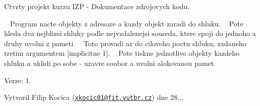Ctvrty projekt kurzu I\+ZP -\/ Dokumentace zdrojovych kodu.

~\newline
Program nacte objekty z adresare a kazdy objekt zaradi do shluku. ~\newline
Pote hleda dva nejblizsi shluky podle nejvzdalenejsi souseda, ktere spoji do jednoho a druhy uvolni z pameti. ~\newline
Toto provadi az do ciloveho poctu shluku, zadaneho tretim argumentem \mbox{[}implicitne 1\mbox{]}. ~\newline
Pote tiskne jednotlive objekty kazdeho shluku a uklidi po sobe -\/ uzavre soubor a uvolni alokovanou pamet.

Verze\+: 1.

Vytvoril Filip Kocica (\href{mailto:xkocic01@fit.vutbr.cz}{\tt xkocic01@fit.\+vutbr.\+cz}) dne 28... 